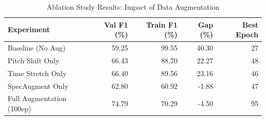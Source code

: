 \begin{table}
\caption{Ablation Study Results: Impact of Data Augmentation}
\label{tab:ablation_results}
\begin{tabular}{lrrrr}
\toprule
Experiment & Val F1 (\%) & Train F1 (\%) & Gap (\%) & Best Epoch \\
\midrule
Baseline (No Aug) & 59.25 & 99.55 & 40.30 & 27 \\
Pitch Shift Only & 66.43 & 88.70 & 22.27 & 48 \\
Time Stretch Only & 66.40 & 89.56 & 23.16 & 46 \\
SpecAugment Only & 62.80 & 60.92 & -1.88 & 47 \\
Full Augmentation (100ep) & 74.79 & 70.29 & -4.50 & 95 \\
\bottomrule
\end{tabular}
\end{table}
